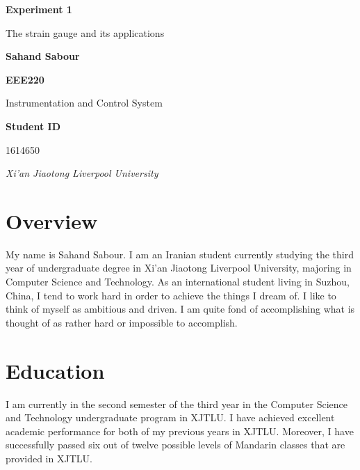 \documentclass[12pt,a4paper]{article}
\begin{document}
	\begin{titlepage}
		
	
		\centering
		\textbf{\Huge Experiment 1}
		
		\vspace{1.5cm}
		
		{\huge The strain gauge and its applications}
		
		\vspace{4cm}
		
		\textbf{\LARGE Sahand Sabour}
		
		\vspace{2cm}
		
		\textbf{\large EEE220}
		
		\vspace{0.5cm}
		
		{\large Instrumentation and Control System}
		
		\vspace{1.5cm}
		
		
		
		
		
		\textbf{\large Student ID}
		
		\vspace{0.5cm}
		
		{\large 1614650}
		
		\vfill
		
		{\itshape Xi'an Jiaotong Liverpool University}
		
	\end{titlepage}

	
	
	\section{Overview}

	My name is Sahand Sabour. I am an Iranian student currently studying the third year of undergraduate degree in Xi'an Jiaotong Liverpool University, majoring in Computer Science and Technology. 
	As an international student living in Suzhou, China, I tend to work hard in order to achieve the things I dream of. I like to think of myself as ambitious and driven. I am quite fond of accomplishing what is thought of as rather hard or impossible to accomplish. 
	
	\section{Education}
	
	I am currently in the second semester of the third year in the Computer Science and Technology undergraduate program in XJTLU. I have achieved excellent academic performance for both of my previous years in XJTLU. Moreover, I have successfully passed six out of twelve possible levels of Mandarin classes that are provided in XJTLU. 
	
\end{document}
